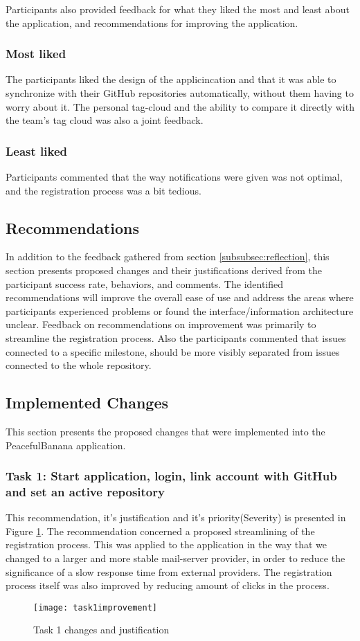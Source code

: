 Participants also provided feedback for what they liked the most and least about the application, and recommendations for improving the application. 
\subsubsection*{Most liked}
The participants liked the design of the applicincation and that it was able to synchronize with their GitHub repositories automatically, without them having to worry about it. The personal tag-cloud and the ability to compare it directly with the team's tag cloud was also a joint feedback.
\subsubsection*{Least liked}
Participants commented that the way notifications were given was not optimal, and the registration process was a bit tedious.
\subsection{Recommendations}
In addition to the feedback gathered from section \ref{subsubsec:reflection}, this section presents proposed changes and their justifications derived from the participant success rate, behaviors, and comments. The identified recommendations will improve the overall ease of use and address the areas where participants experienced problems or found the interface/information architecture unclear.
Feedback on recommendations on improvement was primarily to streamline the registration process. Also the participants commented that issues connected to a specific milestone, should be more visibly separated from issues connected to the whole repository. 

\subsection*{Implemented Changes}
This section presents the proposed changes that were implemented into the PeacefulBanana application. 
\subsubsection*{Task 1: Start application, login, link account with GitHub and set an active repository}
This recommendation, it's justification and it's priority(Severity) is presented in Figure \ref{task1improvement}.
The recommendation concerned a proposed streamlining of the registration process. This was applied to the application in the way that we changed to a larger and more stable mail-server provider, in order to reduce the significance of a slow response time from external providers. The registration process itself was also improved by reducing amount of clicks in the process. 
\begin{figure}[h!]
    \centering
        \texttt{[image: task1improvement]}
    \caption{Task 1 changes and justification}
    \label{task1improvement}
\end{figure}

